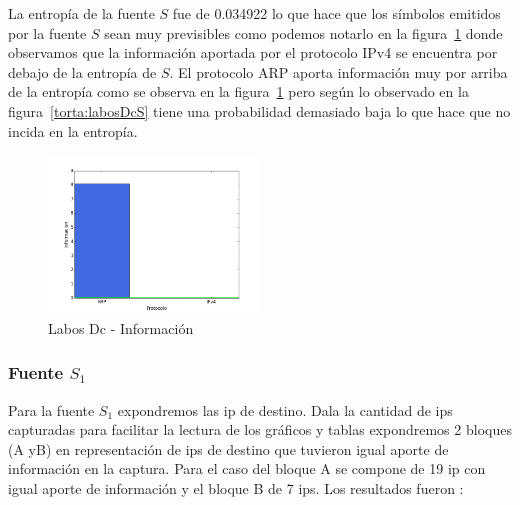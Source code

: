 \documentclass[final,inline,narroweqnarray,a4paper]{ieee}
\begin{document}
La entropía de la fuente $S$ fue de 0.034922 lo que hace que los símbolos emitidos por la fuente $S$ sean muy previsibles como podemos notarlo en la figura~\ref{histo:laboDcS} donde observamos que la información aportada por el protocolo IPv4 se encuentra por debajo de la entropía de $S$. El protocolo ARP aporta información muy por arriba de la entropía como se observa en la figura~\ref{histo:laboDcS} pero según lo observado en la figura~\ref{torta:labosDcS} tiene una probabilidad demasiado baja lo que hace que no incida en la entropía.

\begin{figure}[H]
    \begin{center}
        \includegraphics[width=0.5\textwidth]{plot/laboDcS-bar.png}
        \caption{Labos Dc - Información}
        \label{histo:laboDcS}
    \end{center}
\end{figure}

\subsubsection{Fuente $S_1$}

Para la fuente $S_1$ expondremos las ip de destino. Dala la cantidad de ips capturadas para facilitar la lectura de los gráficos y tablas expondremos 2 bloques (A yB) en representación de ips de destino que tuvieron igual aporte de información en la captura. Para el caso del bloque A se compone de 19 ip con igual aporte de información y el bloque B de 7 ips. Los resultados fueron :
\end{document}
